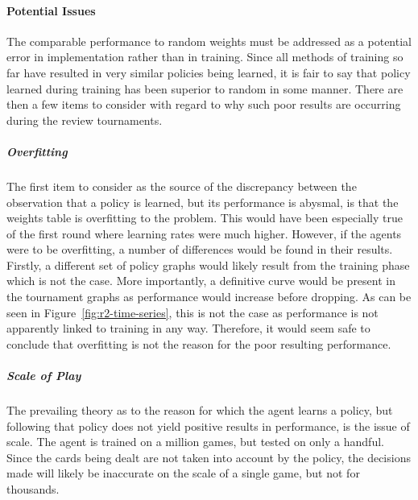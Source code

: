
\paragraph*{Potential Issues}
\label{sec:findings-r2-potentialissues}

The comparable performance to random weights must be addressed as a potential
error in implementation rather than in training.
%
Since all methods of training so far have resulted in very similar policies
being learned,
it is fair to say that policy learned during training has been superior to
random in some manner.
%
There are then a few items to consider with regard to why such poor results are occurring
during the review tournaments.


\subparagraph*{Overfitting}

The first item to consider as the source of the discrepancy between the
observation that a policy is learned,
but its performance is abysmal,
is that the weights table is overfitting to the problem.
%
This would have been especially true of the first round where learning rates
were much higher.
%
However,
if the agents were to be overfitting,
a number of differences would be found in their results.
%
Firstly,
a different set of policy graphs would likely result from the training phase
which is not the case.
%
More importantly,
a definitive curve would be present in the tournament graphs as performance
would increase before dropping.
%
As can be seen in Figure~\ref{fig:r2-time-series},
this is not the case
as performance is not apparently linked to training in any way.
%
Therefore, it would seem safe to conclude that overfitting is not the reason
for the poor resulting performance.


\subparagraph*{Scale of Play}

The prevailing theory as to the reason for which the agent learns a policy,
but following that policy does not yield positive results in performance,
is the issue of scale.
%
The agent is trained on a million games,
but tested on only a handful.
%
Since the cards being dealt are not taken into account by the policy,
the decisions made will likely be inaccurate on the scale of a single game,
but not for thousands.





